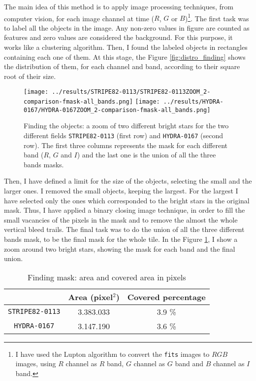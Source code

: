 \documentclass{article}
\begin{document}
The main idea of this method is to apply image processing techniques, from computer vision, for each image channel at time ($R$, $G$ or $B$)\footnote{I have used the Lupton algorithm \cite{Lupton2003} to convert the \texttt{fits} images to $RGB$ images, using $R$ channel as $R$ band, $G$ channel as $G$ band and $B$ channel as $I$ band.}. The first task was to label all the objects in the image.  Any non-zero values in figure are counted as features and zero values are considered the background. For this purpose, it works like a clustering algorithm. Then, I found the labeled objects in rectangles containing each one of them. At this stage, the Figure \ref{fig:distro_finding} shows the distribution of them, for each channel and band, according to their square root of their size.

\begin{figure}[h!]
  \centering
  \texttt{[image: ../results/STRIPE82-0113/STRIPE82-0113ZOOM\_2-comparison-fmask-all\_bands.png]}
  \texttt{[image: ../results/HYDRA-0167/HYDRA-0167ZOOM\_2-comparison-fmask-all\_bands.png]}
  \caption{Finding the objects: a zoom of two different bright stars for the two different fields \texttt{STRIPE82-0113} (first row) and \texttt{HYDRA-0167} (second row). The first three columns represents the mask for each different band ($R$, $G$ and $I$) and the last one is the union of all the three bands masks.}
  \label{fig:zoom_mask_finding}
\end{figure}


Then, I have defined a limit for the size of the objects, selecting the small and the larger ones. I removed the small objects, keeping the largest. For the largest I have selected only the ones which corresponded to the bright stars in the original mask. Thus, I have applied a binary closing image technique, in order to fill the small vacancies of the pixels in the mask and to remove the almost the whole vertical bleed trails. The final task was to do the union of all the three different bands mask, to be the final mask for the whole tile. In the Figure \ref{fig:zoom_mask_finding}, I show a zoom around two bright stars, showing the mask for each band and the final union.

\begin{table}[h!]
  \centering
  \caption{Finding mask: area and covered area in pixels}
  \begin{tabular}{c|c|c}
    \cline{2-3}
     & {\cellcolor{orange!20}\bf Area (pixel$^2$)} & {\cellcolor{orange!20}\bf Covered percentage} \\
    \hline
    {\cellcolor{blue!20}\texttt{STRIPE82-0113}} & 3.383.033 & 3.9 \%\\
    \hline
    {\cellcolor{blue!20}\texttt{HYDRA-0167}} & 3.147.190 & 3.6 \%\\
    \hline
  \end{tabular}
  \label{tb:finding_masks}
\end{table}
\end{document}
